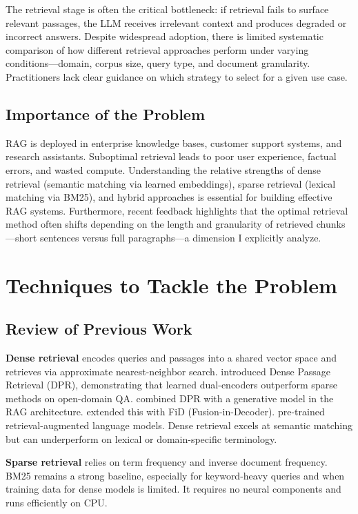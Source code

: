 \documentclass[twoside, 11pt]{article}
\begin{document}
The retrieval stage is often the critical bottleneck: if retrieval fails to surface relevant passages, the LLM receives irrelevant context and produces degraded or incorrect answers. Despite widespread adoption, there is limited systematic comparison of how different retrieval approaches perform under varying conditions---domain, corpus size, query type, and document granularity. Practitioners lack clear guidance on which strategy to select for a given use case.

\subsection{Importance of the Problem}
RAG is deployed in enterprise knowledge bases, customer support systems, and research assistants. Suboptimal retrieval leads to poor user experience, factual errors, and wasted compute. Understanding the relative strengths of dense retrieval (semantic matching via learned embeddings), sparse retrieval (lexical matching via BM25), and hybrid approaches is essential for building effective RAG systems. Furthermore, recent feedback highlights that the optimal retrieval method often shifts depending on the length and granularity of retrieved chunks---short sentences versus full paragraphs---a dimension I explicitly analyze.

\section{Techniques to Tackle the Problem}
\subsection{Review of Previous Work}
\textbf{Dense retrieval} encodes queries and passages into a shared vector space and retrieves via approximate nearest-neighbor search. \citet{karpukhin2020dense} introduced Dense Passage Retrieval (DPR), demonstrating that learned dual-encoders outperform sparse methods on open-domain QA. \citet{lewis2020rag} combined DPR with a generative model in the RAG architecture. \citet{izacard2021leveraging} extended this with FiD (Fusion-in-Decoder). \citet{guu2020realm} pre-trained retrieval-augmented language models. Dense retrieval excels at semantic matching but can underperform on lexical or domain-specific terminology.

\textbf{Sparse retrieval} relies on term frequency and inverse document frequency. BM25 \citep{robertson2009probabilistic} remains a strong baseline, especially for keyword-heavy queries and when training data for dense models is limited. It requires no neural components and runs efficiently on CPU.
\end{document}
